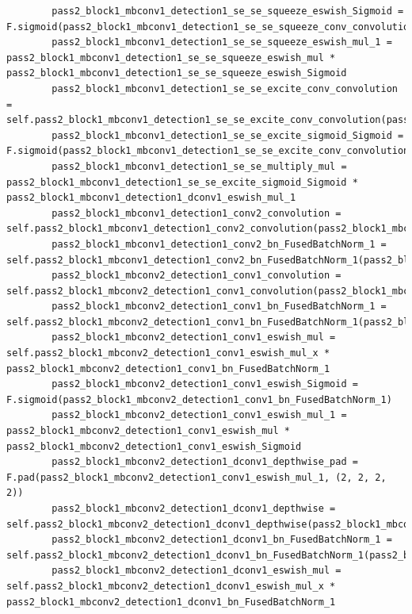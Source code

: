\documentclass{fisatprojectfinal}
\begin{document}
\begin{appendices}
\begin{lstlisting}
        pass2_block1_mbconv1_detection1_se_se_squeeze_eswish_Sigmoid = F.sigmoid(pass2_block1_mbconv1_detection1_se_se_squeeze_conv_convolution)
        pass2_block1_mbconv1_detection1_se_se_squeeze_eswish_mul_1 = pass2_block1_mbconv1_detection1_se_se_squeeze_eswish_mul * pass2_block1_mbconv1_detection1_se_se_squeeze_eswish_Sigmoid
        pass2_block1_mbconv1_detection1_se_se_excite_conv_convolution = self.pass2_block1_mbconv1_detection1_se_se_excite_conv_convolution(pass2_block1_mbconv1_detection1_se_se_squeeze_eswish_mul_1)
        pass2_block1_mbconv1_detection1_se_se_excite_sigmoid_Sigmoid = F.sigmoid(pass2_block1_mbconv1_detection1_se_se_excite_conv_convolution)
        pass2_block1_mbconv1_detection1_se_se_multiply_mul = pass2_block1_mbconv1_detection1_se_se_excite_sigmoid_Sigmoid * pass2_block1_mbconv1_detection1_dconv1_eswish_mul_1
        pass2_block1_mbconv1_detection1_conv2_convolution = self.pass2_block1_mbconv1_detection1_conv2_convolution(pass2_block1_mbconv1_detection1_se_se_multiply_mul)
        pass2_block1_mbconv1_detection1_conv2_bn_FusedBatchNorm_1 = self.pass2_block1_mbconv1_detection1_conv2_bn_FusedBatchNorm_1(pass2_block1_mbconv1_detection1_conv2_convolution)
        pass2_block1_mbconv2_detection1_conv1_convolution = self.pass2_block1_mbconv2_detection1_conv1_convolution(pass2_block1_mbconv1_detection1_conv2_bn_FusedBatchNorm_1)
        pass2_block1_mbconv2_detection1_conv1_bn_FusedBatchNorm_1 = self.pass2_block1_mbconv2_detection1_conv1_bn_FusedBatchNorm_1(pass2_block1_mbconv2_detection1_conv1_convolution)
        pass2_block1_mbconv2_detection1_conv1_eswish_mul = self.pass2_block1_mbconv2_detection1_conv1_eswish_mul_x * pass2_block1_mbconv2_detection1_conv1_bn_FusedBatchNorm_1
        pass2_block1_mbconv2_detection1_conv1_eswish_Sigmoid = F.sigmoid(pass2_block1_mbconv2_detection1_conv1_bn_FusedBatchNorm_1)
        pass2_block1_mbconv2_detection1_conv1_eswish_mul_1 = pass2_block1_mbconv2_detection1_conv1_eswish_mul * pass2_block1_mbconv2_detection1_conv1_eswish_Sigmoid
        pass2_block1_mbconv2_detection1_dconv1_depthwise_pad = F.pad(pass2_block1_mbconv2_detection1_conv1_eswish_mul_1, (2, 2, 2, 2))
        pass2_block1_mbconv2_detection1_dconv1_depthwise = self.pass2_block1_mbconv2_detection1_dconv1_depthwise(pass2_block1_mbconv2_detection1_dconv1_depthwise_pad)
        pass2_block1_mbconv2_detection1_dconv1_bn_FusedBatchNorm_1 = self.pass2_block1_mbconv2_detection1_dconv1_bn_FusedBatchNorm_1(pass2_block1_mbconv2_detection1_dconv1_depthwise)
        pass2_block1_mbconv2_detection1_dconv1_eswish_mul = self.pass2_block1_mbconv2_detection1_dconv1_eswish_mul_x * pass2_block1_mbconv2_detection1_dconv1_bn_FusedBatchNorm_1

\end{lstlisting}
\end{appendices}
\end{document}
